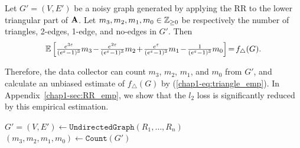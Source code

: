 \begin{proposition}\label{chap1-prop:triangle_emp}
  Let $G'=(V,E')$ be a noisy graph generated by applying the RR to the lower triangular part of $\mathbf{A}$.
  Let $m_3, m_2, m_1, m_0 \in \mathbb{Z}_{\ge0}$ be respectively the number of triangles, 2-edges, 1-edge, and no-edges in $G'$. 
  Then 
  \begin{align}
      \textstyle{\mathbb{E}\left[ \frac{e^{3\epsilon}}{(e^\epsilon-1)^3} m_3 \hspace{-0.5mm}-\hspace{-0.5mm} \frac{e^{2\epsilon}}{(e^\epsilon-1)^3} m_2 \hspace{-0.5mm}+\hspace{-0.5mm} \frac{e^\epsilon}{(e^\epsilon-1)^3} m_1 \hspace{-0.5mm}-\hspace{-0.5mm} \frac{1}{(e^\epsilon-1)^3} m_0 \right] \hspace{-0.5mm} = \hspace{-0.5mm} f_\triangle(G).}
      \label{chap1-eq:triangle_emp}
  \end{align}
\end{proposition}

Therefore, the data collector can count $m_3$, $m_2$, $m_1$, and $m_0$ from $G'$, and calculate an unbiased estimate of $f_\triangle(G)$ by (\ref{chap1-eq:triangle_emp}). 
In Appendix~\ref{chap1-sec:RR_emp}, we show that the $l_2$ loss is significantly reduced by this empirical estimation.

\setlength{\algomargin}{4mm}
\begin{algorithm}
  \SetAlgoLined
  $G'=(V,E') \leftarrow \texttt{UndirectedGraph}(R_1, \ldots, R_n)$\;
  $(m_3, m_2, m_1, m_0) \leftarrow \texttt{Count}(G')$\;

  \caption{\label{chap1-alg:subgraph-rr}}
\end{algorithm}

